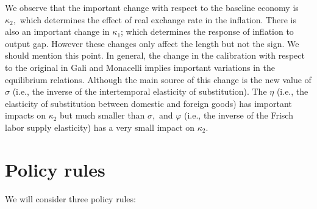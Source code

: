 \documentclass{article}
\begin{document}
We observe that the important change with respect to the baseline economy is 
$\kappa _{2},$ which determines the effect of real exchange rate in the
inflation. There is also an important change in $\kappa _{1}$; which
determines the response of inflation to output gap. However these changes
only affect the length but not the sign. We should mention this point. In
general, the change in the calibration with respect to the original in Gali
and Monacelli implies important variations in the equilibrium relations.
Although the main source of this change is the new value of $\sigma $ (i.e.,
the inverse of the intertemporal elasticity of substitution). The $\eta $
(i.e., the elasticity of substitution between domestic and foreign goods)
has important impacts on $\kappa _{2}$ but much smaller than $\sigma ,$ and $%
\varphi $ (i.e., the inverse of the Frisch labor supply elasticity) has a
very small impact on $\kappa _{2}.$

\section{Policy rules}

We will consider three policy rules:
\end{document}
